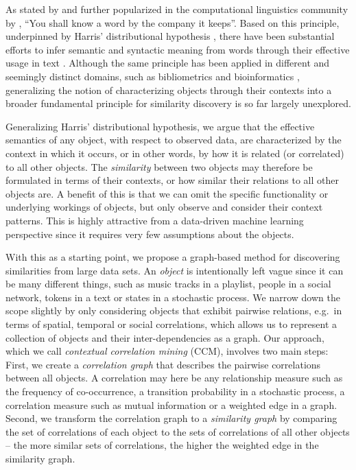 \documentclass{kais}
\begin{document}
As stated by  and further popularized in the computational linguistics community by , 
``You shall know a word by the company it keeps''. Based on this principle, underpinned by Harris' distributional hypothesis \cite{Harris54}, 
there have been substantial efforts to infer semantic and syntactic meaning
 from words through their effective usage in text \cite{Harispe2015}. Although the same principle has been applied in 
 different and seemingly distinct domains, such as bibliometrics  \cite{Kessler1963} and bioinformatics 
 \cite{ravasz2002hierarchical}, generalizing the notion of characterizing objects through 
their contexts into a broader fundamental principle for similarity discovery is so far largely unexplored.

Generalizing Harris' distributional hypothesis, we argue that the effective semantics of any object, with respect to observed data, are characterized 
by the context in which it occurs, or in other words, by how it is related (or correlated) to all other objects. The \emph{similarity} 
between two objects may therefore be formulated in terms of their contexts, or how similar their relations to all other
objects are.
A benefit of this is that we can omit the specific functionality or underlying workings of objects, but
only observe and consider their context patterns. This is highly attractive from a data-driven machine learning
perspective since it requires very few assumptions about the objects.

With this as a starting point, we propose a graph-based method for discovering similarities from large data
sets. An \emph{object} is intentionally left vague since it can be many different things, such as
music tracks in a playlist, people in a social network, tokens in a text or states in a stochastic process. We narrow down the scope
slightly by only considering objects that exhibit pairwise relations, e.g.\ in terms of spatial, temporal or social
correlations, which allows us to represent a collection of objects and their inter-dependencies as a graph. Our
approach, which we call \emph{contextual correlation mining} (CCM), involves two main steps: First, we create a \emph{correlation graph} 
that describes the pairwise correlations between all objects. A correlation may here be any relationship measure such as the frequency 
of co-occurrence, a transition probability in a stochastic process, a correlation measure such as mutual information or a weighted edge in a graph. 
Second, we transform the correlation graph to a \emph{similarity graph} by comparing the set of correlations of each object
to the sets of correlations of all other objects -- the more similar sets of correlations, the higher the weighted edge in the
similarity graph.
\end{document}
